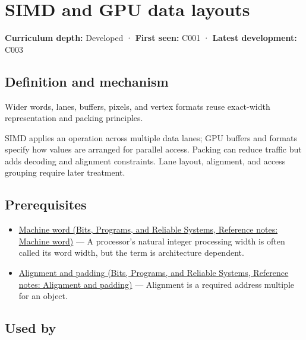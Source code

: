 \hypertarget{appendix-3c7b1a56de01}{}\label{referencestart:appendix-3c7b1a56de01}
\section{SIMD and GPU data layouts}\label{appendix-3c7b1a56de01-simd-and-gpu-data-layouts}

\textbf{Curriculum depth:} Developed · \textbf{First seen:} C001 · \textbf{Latest development:} C003

\begin{allmightroledefinition}

\subsection{Definition and mechanism}\label{appendix-3c7b1a56de01-definition-and-mechanism}

Wider words, lanes, buffers, pixels, and vertex formats reuse exact-width representation and packing principles.

\end{allmightroledefinition}

SIMD applies an operation across multiple data lanes; GPU buffers and formats specify how values are arranged for parallel access. Packing can reduce traffic but adds decoding and alignment constraints. Lane layout, alignment, and access grouping require later treatment.

\subsection{Prerequisites}\label{appendix-3c7b1a56de01-prerequisites}

\begin{itemize}
\tightlist
\item
  \href{../01-Bits-Programs-and-Reliable-Systems/main.pdf\#nameddest=appendix-d67a19507dc5}{Machine word (Bits, Programs, and Reliable Systems, Reference notes: Machine word)} --- A processor's natural integer processing width is often called its word width, but the term is architecture dependent.
\item
  \href{../01-Bits-Programs-and-Reliable-Systems/main.pdf\#nameddest=appendix-a1f7c53b4742}{Alignment and padding (Bits, Programs, and Reliable Systems, Reference notes: Alignment and padding)} --- Alignment is a required address multiple for an object.
\end{itemize}

\subsection{Used by}\label{appendix-3c7b1a56de01-used-by}

